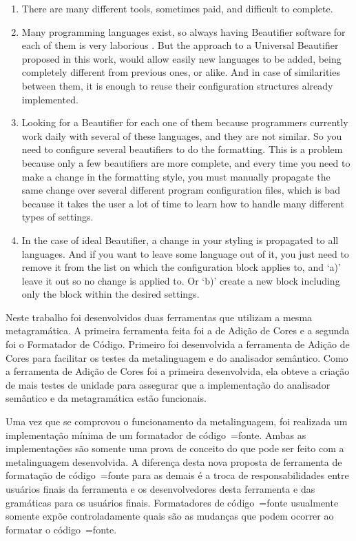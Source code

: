 {\begin{enumerate}[leftmargin=*]
    \item
        There are many different tools, sometimes paid, and difficult to
        complete. \cite{universalCodeFormatter}
    \item
        Many programming languages exist, so always having Beautifier
        software for each of them is very laborious
        \cite{universalCodeFormatter}. But the approach to a Universal
        Beautifier proposed in this work, would allow easily new languages to be
        added, being completely different from previous ones, or alike. And in
        case of similarities between them, it is enough to reuse their
        configuration structures already implemented.
    \item
        Looking for a Beautifier for each one of them because programmers
        currently work daily with several of these languages, and they are not
        similar. So you need to configure several beautifiers to do the
        formatting. This is a problem because only a few beautifiers are more
        complete, and every time you need to make a change in the formatting
        style, you must manually propagate the same change over several
        different program configuration files, which is bad because it takes the
        user a lot of time to learn how to handle many different types of
        settings. \cite{universalIndentGUI}
    \item
        In the case of ideal Beautifier, a change in your styling is
        propagated to all languages. And if you want to leave some language out
        of it, you just need to remove it from the list on which the
        configuration block applies to, and `a)' leave it out so no change is
        applied to. Or `b)' create a new block including only the block within
        the desired settings.
\end{enumerate}
}{%
    Neste trabalho foi desenvolvidos duas ferramentas que utilizam a mesma metagramática.
    A primeira ferramenta feita foi a de Adição de Cores e
    a segunda foi o Formatador de Código.
    Primeiro foi desenvolvida a ferramenta de Adição de Cores para facilitar os testes da metalinguagem e
    do analisador semântico.
    Como a ferramenta de Adição de Cores foi a primeira desenvolvida,
    ela obteve a criação de mais testes de unidade para assegurar que a implementação do analisador semântico e
    da metagramática estão funcionais.

    Uma vez que se comprovou o funcionamento da metalinguagem,
    foi realizada um implementação mínima de um formatador de código~=fonte.
    Ambas as implementações são somente uma prova de conceito do que pode ser feito com a metalinguagem desenvolvida.
    A diferença desta nova proposta de ferramenta de formatação de código~=fonte para as demais é a troca de responsabilidades entre usuários finais da ferramenta e
    os desenvolvedores desta ferramenta e
    das gramáticas para os usuários finais.
    Formatadores de código~=fonte usualmente somente expõe controladamente quais são as mudanças que podem ocorrer ao formatar o código~=fonte.

}
